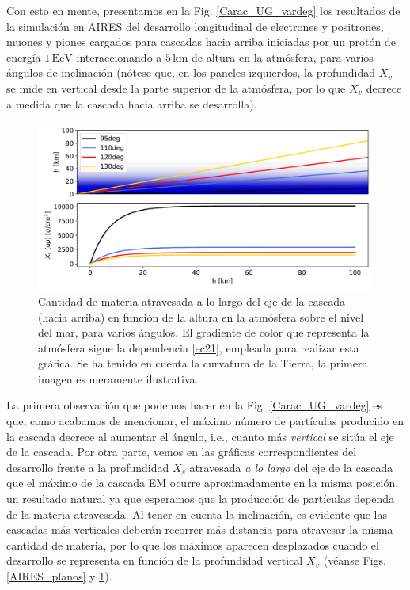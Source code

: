\documentclass[11 pt, a4paper]{article} %
\numberwithin{equation}{section}
\numberwithin{figure}{section}
\numberwithin{table}{section}
\begin{document}
	Con esto en mente, presentamos en la Fig. \ref{Carac_UG_vardeg} los resultados de la simulación en AIRES del desarrollo longitudinal de electrones y positrones, muones y piones cargados para cascadas hacia arriba iniciadas por un protón de energía $1\,\mathrm{EeV}$ interaccionando a $5\,\mathrm{km}$ de altura en la atmósfera, para varios ángulos de inclinación (nótese que, en los paneles izquierdos, la profundidad $X_v$ se mide en vertical desde la parte superior de la atmósfera, por lo que $X_v$ decrece a medida que la cascada hacia arriba se desarrolla).
	\begin{figure}[H]
		\centering
		\includegraphics[width=.7\linewidth]{figures/cascadas/Profatravesadavsang}
		\caption{Cantidad de materia atravesada a lo largo del eje de la cascada (hacia arriba) en función de la altura en la atmósfera sobre el nivel del mar, para varios ángulos. El gradiente de color que representa la atmósfera sigue la dependencia \eqref{ec21}, empleada para realizar esta gráfica. Se ha tenido en cuenta la curvatura de la Tierra, la primera imagen es meramente ilustrativa.}
		\label{Profatravesadavsang}
	\end{figure}

La primera observación que podemos hacer en la Fig. \ref{Carac_UG_vardeg} es que, como acabamos de mencionar, el máximo número de partículas producido en la cascada decrece al aumentar el ángulo, i.e., cuanto más \textit{vertical} se sitúa el eje de la cascada. Por otra parte, vemos en las gráficas correspondientes del desarrollo frente a la profundidad $X_s$ atravesada \textit{a lo largo} del eje de la cascada que el máximo de la cascada EM ocurre aproximadamente en la misma posición, un resultado natural ya que esperamos que la producción de partículas dependa de la materia atravesada. Al tener en cuenta la inclinación, es evidente que las cascadas más verticales deberán recorrer más distancia para atravesar la misma cantidad de materia, por lo que los máximos aparecen desplazados cuando el desarrollo se representa en función de la profundidad vertical $X_v$ (véanse Figs. \ref{AIRES_planos} y \ref{Profatravesadavsang}). 
\end{document}
